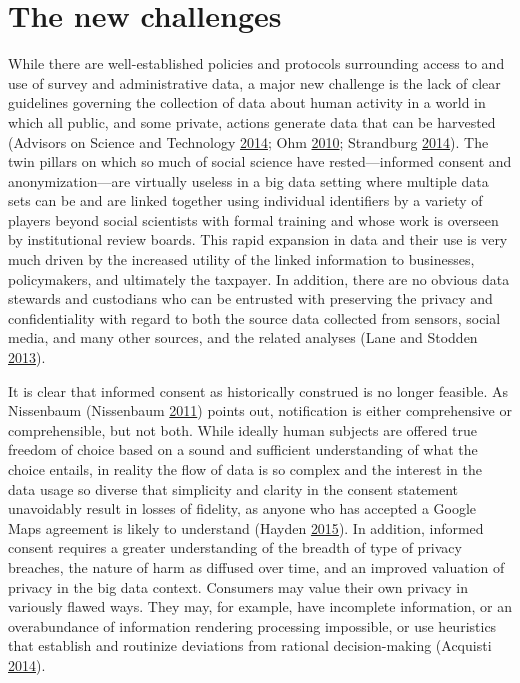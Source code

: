 \documentclass[]{krantz}
\begin{document}
\section{The new challenges}\label{the-new-challenges}

While there are well-established policies and protocols surrounding
access to and use of survey and administrative data, a major new
challenge is the lack of clear guidelines governing the collection of
data about human activity in a world in which all public, and some
private, actions generate data that can be harvested (Advisors on
Science and Technology \protect\hyperlink{ref-house2014big}{2014}; Ohm
\protect\hyperlink{ref-ohm2010broken}{2010}; Strandburg
\protect\hyperlink{ref-Strandburg2014}{2014}). The twin pillars on which
so much of social science have rested---informed consent and
anonymization---are virtually useless in a big data setting where
multiple data sets can be and are linked together using individual
identifiers by a variety of players beyond social scientists with formal
training and whose work is overseen by institutional review boards. This
rapid expansion in data and their use is very much driven by the
increased utility of the linked information to businesses, policymakers,
and ultimately the taxpayer. In addition, there are no obvious data
stewards and custodians who can be entrusted with preserving the privacy
and confidentiality with regard to both the source data collected from
sensors, social media, and many other sources, and the related analyses
(Lane and Stodden \protect\hyperlink{ref-lane2013me}{2013}).

It is clear that informed consent as historically construed is no longer
feasible. As Nissenbaum (Nissenbaum
\protect\hyperlink{ref-nissenbaum2011contextual}{2011}) points out,
notification is either comprehensive or comprehensible, but not both.
While ideally human subjects are offered true freedom of choice based on
a sound and sufficient understanding of what the choice entails, in
reality the flow of data is so complex and the interest in the data
usage so diverse that simplicity and clarity in the consent statement
unavoidably result in losses of fidelity, as anyone who has accepted a
Google Maps agreement is likely to understand (Hayden
\protect\hyperlink{ref-check2015researchers}{2015}). In addition,
informed consent requires a greater understanding of the breadth of type
of privacy breaches, the nature of harm as diffused over time, and an
improved valuation of privacy in the big data context. Consumers may
value their own privacy in variously flawed ways. They may, for example,
have incomplete information, or an overabundance of information
rendering processing impossible, or use heuristics that establish and
routinize deviations from rational decision-making (Acquisti
\protect\hyperlink{ref-Acquisti2014}{2014}).
\end{document}

